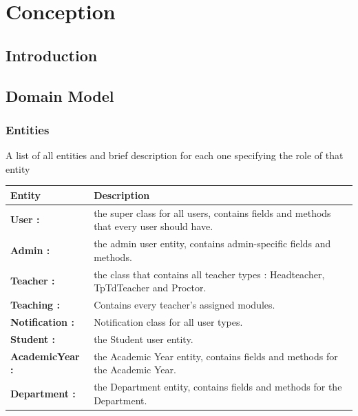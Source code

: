 \documentclass[]{uc2pfecaneva}
\begin{document}
    \setlength{\parskip}{6pt}
    \tableofcontents
    \setcounter{chapter}{1}
    \chapter{Conception}
    \newpage

    \raggedright\section{Introduction}
    \clearpage


    \begin{table}
        \raggedright\section{Domain Model}
        \raggedright\subsection{Entities}
        A list of all entities and brief description for each one specifying the role of that entity\linebreak \\
        \begin{tabularx}{\textwidth}{|l|X|}
            \hline
            Entity          & Description                                                                                                                                                                \\ \hline
            \textbf{User :} & the super class for all users, contains fields and methods that every user should have.\\ \hline
            \textbf{Admin :} & the admin user entity, contains admin-specific fields and methods.\\ \hline
            \textbf{Teacher :} & the class that contains all teacher types : Headteacher, TpTdTeacher and Proctor.\\ \hline
            \textbf{Teaching :} & Contains every teacher's assigned modules.\\ \hline
            \textbf{Notification :} & Notification class for all user types.\\ \hline
            \textbf{Student :} & the Student user entity.\\ \hline
            \textbf{AcademicYear :} & the Academic Year entity, contains fields and methods for the Academic Year.\\ \hline
            \textbf{Department :} & the Department entity, contains fields and methods for the Department.\\ \hline

\end{tabularx}
\end{table}
\end{document}
